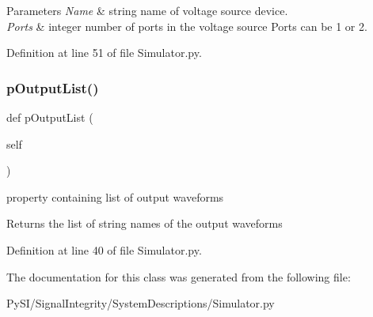\begin{DoxyParams}{Parameters}
{\em Name} & string name of voltage source device. \\
\hline
{\em Ports} & integer number of ports in the voltage source Ports can be 1 or 2. \\
\hline
\end{DoxyParams}


Definition at line 51 of file Simulator.\+py.

\mbox{\label{classSignalIntegrity_1_1SystemDescriptions_1_1Simulator_1_1Simulator_a4e93b3fc1994f14f72cdcebbf9b68127}} 
\subsubsection{\texorpdfstring{p\+Output\+List()}{pOutputList()}}
{\footnotesize\ttfamily def p\+Output\+List (\begin{DoxyParamCaption}\item[{}]{self }\end{DoxyParamCaption})}



property containing list of output waveforms 

\begin{DoxyReturn}{Returns}
the list of string names of the output waveforms 
\end{DoxyReturn}


Definition at line 40 of file Simulator.\+py.



The documentation for this class was generated from the following file\+:\begin{DoxyCompactItemize}
\item 
Py\+S\+I/\+Signal\+Integrity/\+System\+Descriptions/Simulator.\+py\end{DoxyCompactItemize}
